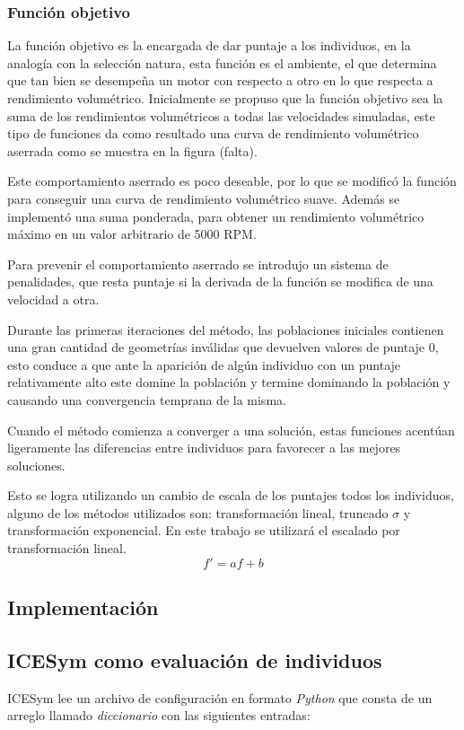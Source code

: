 \subsubsection{Función objetivo}\label{sec:funcion_objetivo}
%
La función objetivo es la encargada de dar puntaje a los individuos, en la
analogía con la selección natura, esta función es el ambiente, el que determina
que tan bien se desempeña un motor con respecto a otro en lo que respecta a
rendimiento volumétrico.
%
Inicialmente se propuso que la función objetivo sea la suma de los rendimientos
volumétricos a todas las velocidades simuladas, este tipo de funciones da como
resultado una curva de rendimiento volumétrico aserrada como se muestra en la
figura (falta).

Este comportamiento aserrado es poco deseable, por lo que se modificó la
función para conseguir una curva de rendimiento volumétrico suave.
%
Además se implementó una suma ponderada, para obtener un rendimiento
volumétrico máximo en un valor arbitrario de 5000 RPM.\@

Para prevenir el comportamiento aserrado se introdujo un sistema de
penalidades, que resta puntaje si la derivada de la función se modifica de una
velocidad a otra.


Durante las primeras iteraciones del método, las poblaciones iniciales
contienen una gran cantidad de geometrías inválidas que devuelven valores de
puntaje 0, esto conduce a que ante la aparición de algún individuo con un
puntaje relativamente alto este domine la población y termine dominando la
población y causando una convergencia temprana de la misma.

Cuando el método comienza a converger a una solución, estas funciones acentúan
ligeramente las diferencias entre individuos para favorecer a las mejores
soluciones.

Esto se logra utilizando un cambio de escala de los puntajes todos los
individuos, alguno de los métodos utilizados son: transformación lineal,
truncado $\sigma$ y transformación exponencial.
%
En este trabajo se utilizará el escalado por transformación lineal.
\begin{equation}
    f' = af + b
\end{equation}

\subsection{Implementación}

\subsection{ICESym como evaluación de individuos}
%
ICESym lee un archivo de configuración en formato \emph{Python} que consta de
un arreglo llamado \emph{diccionario} con las siguientes entradas:

